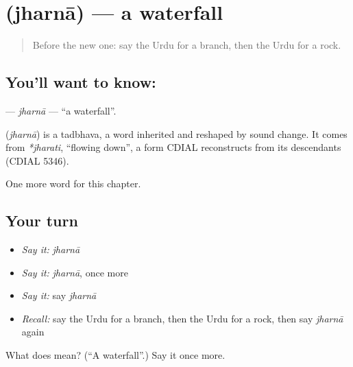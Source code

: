 \section[\texorpdfstring{\ur{جھرنا} (jharnā)}{جھرنا (jharnā)}]{ (jharnā) — a waterfall}

\label{lesson:UR-C124-jharna}



\begin{quote}
Before the new one: say the Urdu for a branch, then the Urdu for a rock.
\end{quote}

\subsection*{You'll want to know: }
\textbf{} — \emph{jharnā} — \textquotedblleft{}a waterfall\textquotedblright{}.

\begin{cousinweb}
\textbf{} (\emph{jharnā}) is a tadbhava, a word inherited and reshaped by sound change. It comes from \emph{*jharati}, \textquotedblleft{}flowing down\textquotedblright{}, a form CDIAL reconstructs from its descendants (CDIAL 5346).
\end{cousinweb}

\begin{grammarlens}[title={What you've built}]
One more word for this chapter.
\end{grammarlens}

\subsection*{Your turn}
\begin{itemize}
\raggedright
  \item \emph{Say it:} \emph{jharnā}
  \item \emph{Say it:} \emph{jharnā}, once more
  \item \emph{Say it:} say \emph{jharnā}
  \item \emph{Recall:} say the Urdu for a branch, then the Urdu for a rock, then say \emph{jharnā} again
\end{itemize}

\begin{tcolorbox}[breakable,colback=teal!4,colframe=teal!35!black,title={Before you move on}]
What does  mean? (\textquotedblleft{}A waterfall\textquotedblright{}.) Say it once more.
\end{tcolorbox}
